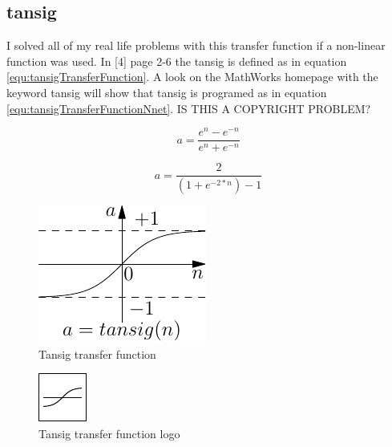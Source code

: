 \subsection{tansig}

\noindent
I solved all of my real life problems with this transfer function if a non-linear function was used. In [4] page 2-6 the tansig is defined as in equation \eqref{equ:tansigTransferFunction}. A look on the MathWorks homepage with the keyword tansig will show that tansig is programed as in equation \eqref{equ:tansigTransferFunctionNnet}. IS THIS A COPYRIGHT PROBLEM?

\begin{equation}
	a = \frac{e^n - e^{-n}}{e^n + e^{-n}}
	\label{equ:tansigTransferFunction}
\end{equation}

\begin{equation}
	a = \frac{2}{(1 + e^{-2*n})-1}
	\label{equ:tansigTransferFunctionNnet}
\end{equation}


\begin{figure}[htb]
\centering
  \includegraphics{octave/neuroToolbox/graphics/tansig}
\caption{Tansig transfer function}
\label{fig:tansigTransferFunction}
\end{figure}

\begin{figure}[htb]
\centering
  \includegraphics{octave/neuroToolbox/graphics/tansiglogo}
\caption{Tansig transfer function logo}
\label{fig:tansigTransferFunctionLogo}
\end{figure}
